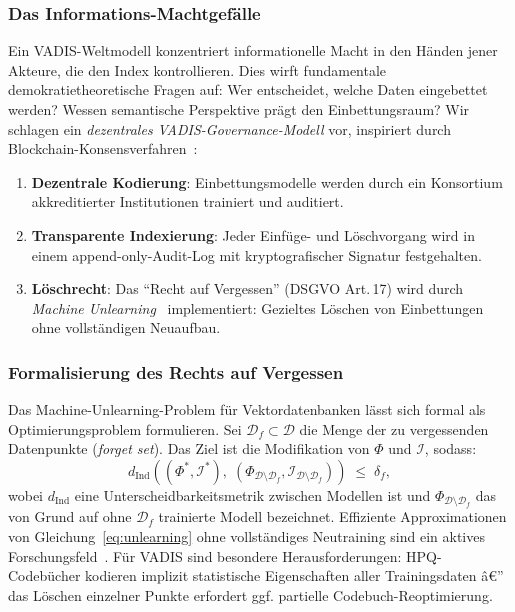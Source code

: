 ﻿\documentclass[12pt,a4paper]{article}
\begin{document}
\subsubsection{Das Informations-Machtgefälle}

Ein VADIS-Weltmodell konzentriert informationelle Macht
in den Händen jener Akteure, die den Index kontrollieren.
Dies wirft fundamentale demokratietheoretische Fragen auf:
Wer entscheidet, welche Daten eingebettet werden?
Wessen semantische Perspektive prägt den Einbettungsraum?
Wir schlagen ein \emph{dezentrales VADIS-Governance-Modell}
vor, inspiriert durch Blockchain-Konsensverfahren~\cite{nakamoto2008bitcoin}:

\begin{enumerate}[leftmargin=1.2em, itemsep=2pt]
  \item \textbf{Dezentrale Kodierung}: Einbettungsmodelle
        werden durch ein Konsortium akkreditierter
        Institutionen trainiert und auditiert.
  \item \textbf{Transparente Indexierung}: Jeder Einfüge-
        und Löschvorgang wird in einem
        append-only-Audit-Log mit kryptografischer
        Signatur festgehalten.
  \item \textbf{Löschrecht}: Das ``Recht auf Vergessen''
        (DSGVO Art.\,17) wird durch
        \emph{Machine Unlearning}~\cite{cao2015machineunlearning}
        implementiert: Gezieltes Löschen von
        Einbettungen ohne vollständigen Neuaufbau.
\end{enumerate}

\subsubsection{Formalisierung des Rechts auf Vergessen}

Das Machine-Unlearning-Problem für Vektordatenbanken
lässt sich formal als Optimie\-rungs\-problem formulieren.
Sei $\mathcal{D}_f \subset \mathcal{D}$ die Menge der
zu vergessenden Datenpunkte (\emph{forget set}).
Das Ziel ist die Modifikation von $\Phi$ und $\mathcal{I}$,
sodass:
\begin{equation}
  d_{\text{Ind}}\!\left(
    (\Phi^*, \mathcal{I}^*),\;
    (\Phi_{\mathcal{D} \setminus \mathcal{D}_f},
     \mathcal{I}_{\mathcal{D} \setminus \mathcal{D}_f})
  \right) \;\leq\; \delta_f,
  \label{eq:unlearning}
\end{equation}
wobei $d_{\text{Ind}}$ eine Unterscheidbarkeitsmetrik
zwischen Modellen ist und $\Phi_{\mathcal{D} \setminus \mathcal{D}_f}$
das von Grund auf ohne $\mathcal{D}_f$ trainierte Modell
bezeichnet. Effiziente Approximationen von
Gleichung~\eqref{eq:unlearning} ohne vollständiges Neutraining
sind ein aktives Forschungsfeld~\cite{bourtoule2021machineunlearning}.
Für VADIS sind besondere Herausforderungen:
HPQ-Codebücher kodieren implizit statistische Eigenschaften
aller Trainingsdaten â€” das Löschen einzelner Punkte
erfordert ggf. partielle Codebuch-Reoptimierung.
\end{document}
